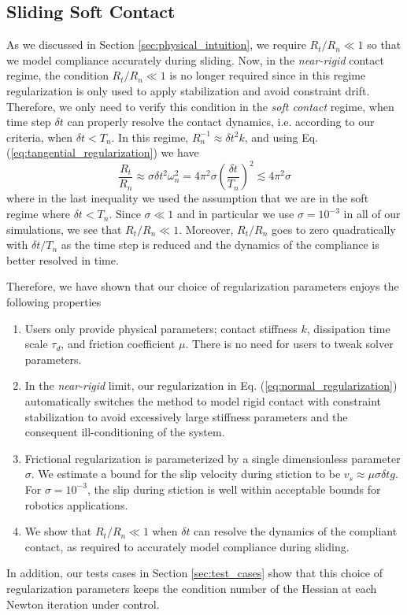 \subsection{Sliding Soft Contact}

As we discussed in Section \ref{sec:physical_intuition}, we require $R_t/R_n\ll
1$ so that we model compliance accurately during sliding. Now, in the
\emph{near-rigid} contact regime, the condition $R_t/R_n\ll 1$ is no longer
required since in this regime regularization is only used to apply stabilization
and avoid constraint drift. Therefore, we only need to verify this condition in
the \emph{soft contact} regime, when time step $\delta t$ can properly resolve
the contact dynamics, i.e. according to our criteria, when $\delta t < T_n$. In
this regime, $R_n^{-1}\approx \delta t^2k$, and using Eq.
(\ref{eq:tangential_regularization}) we have
\begin{equation*}
    \frac{R_t}{R_n}\approx \sigma \delta t^2 \omega_n^2=4\pi^2\sigma\left(\frac{\delta t}{T_n}\right)^2
    \lesssim 4\pi^2\sigma
\end{equation*}
where in the last inequality we used the assumption that we are in the soft
regime where $\delta t < T_n$. Since $\sigma \ll 1$ and in particular we use
$\sigma=10^{-3}$ in all of our simulations, we see that $R_t/R_n \ll 1$.
Moreover, $R_t/R_n$ goes to zero quadratically with $\delta t/T_n$ as the time
step is reduced and the dynamics of the compliance is better resolved in time.

Therefore, we have shown that our choice of regularization parameters enjoys the
following properties
\begin{enumerate}
    \item Users only provide physical parameters; contact stiffness $k$,
    dissipation time scale $\tau_d$, and friction coefficient $\mu$. There is no
    need for users to tweak solver parameters.
    \item In the \emph{near-rigid} limit, our regularization in Eq.
    (\ref{eq:normal_regularization}) automatically switches the method to model
    rigid contact with constraint stabilization to avoid excessively large
    stiffness parameters and the consequent ill-conditioning of the system.
    \item Frictional regularization is parameterized by a single dimensionless
    parameter $\sigma$. We estimate a bound for the slip velocity during
    stiction to be $v_s \approx \mu \sigma \delta t g$. For $\sigma=10^{-3}$,
    the slip during stiction is well within acceptable bounds for robotics
    applications.
    \item We show that $R_t/R_n \ll 1$ when $\delta t$ can resolve the dynamics
    of the compliant contact, as required to accurately model compliance during
    sliding.
\end{enumerate}

In addition, our tests cases in Section \ref{sec:test_cases} show that this
choice of regularization parameters keeps the condition number of the Hessian at
each Newton iteration under control.
